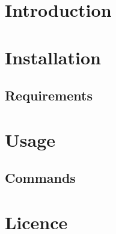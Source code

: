 \documentclass[12pt]{article}
\begin{document}

\tableofcontents

\section{Introduction}


\section{Installation}

\subsection{Requirements}


\section{Usage}

\subsection{Commands}

\section{Licence}

\end{document}
